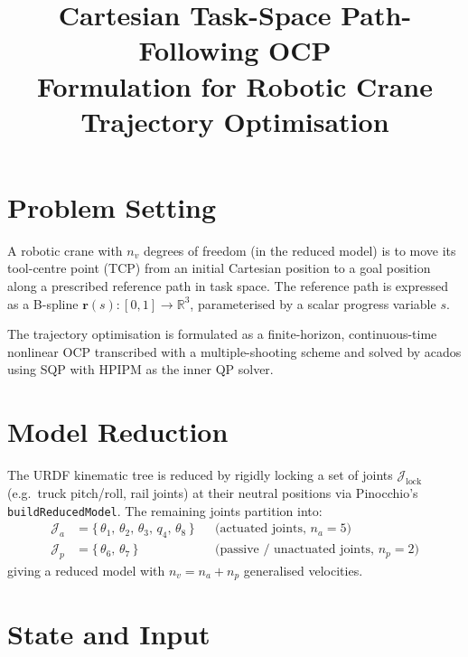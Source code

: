 \documentclass[11pt, a4paper]{article}
\title{\textbf{Cartesian Task-Space Path-Following OCP}\\[0.4em]
  \large Formulation for Robotic Crane Trajectory Optimisation}
\author{}
\date{}
\newcommand{\R}{\mathbb{R}}
\begin{document}
\maketitle

\tableofcontents
\newpage

\section{Problem Setting}

A robotic crane with $n_v$ degrees of freedom (in the reduced model) is to move its
tool-centre point (TCP) from an initial Cartesian position to a goal position along a
prescribed reference path in task space. The reference path is expressed as a B-spline
$\bm{r}(s) : [0,1] \to \R^3$, parameterised by a scalar progress variable $s$.

The trajectory optimisation is formulated as a finite-horizon, continuous-time nonlinear
OCP transcribed with a multiple-shooting scheme and solved by acados using SQP with
HPIPM as the inner QP solver.

\section{Model Reduction}

The URDF kinematic tree is reduced by rigidly locking a set of joints
$\mathcal{J}_\text{lock}$ (e.g.\ truck pitch/roll, rail joints) at their neutral
positions via Pinocchio's \texttt{buildReducedModel}. The remaining joints partition
into:
\begin{align*}
  \mathcal{J}_a &= \{\,\theta_1,\,\theta_2,\,\theta_3,\,q_4,\,\theta_8\,\}
                   &&\text{(actuated joints, }n_a = 5\text{)}\\
  \mathcal{J}_p &= \{\,\theta_6,\,\theta_7\,\}
                   &&\text{(passive / unactuated joints, }n_p = 2\text{)}
\end{align*}
giving a reduced model with $n_v = n_a + n_p$ generalised velocities.

\section{State and Input}
\end{document}
